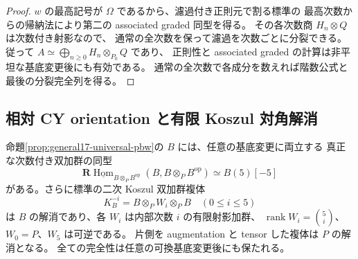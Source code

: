 \begin{proof}
$w$ の最高記号が $\Omega$ であるから、濾過付き正則元で割る標準の
最高次数からの帰納法により第二の associated graded 同型を得る。
その各次数商 $H_n\otimes Q$ は次数付き射影なので、
通常の全次数を保って濾過を次数ごとに分裂できる。
従って $A\simeq\bigoplus_{n\geq0}H_n\otimes_{P_0}Q$ であり、
正則性と associated graded の計算は非平坦な基底変更後にも有効である。
通常の全次数で各成分を数えれば階数公式と最後の分裂完全列を得る。
\end{proof}

\subsection{相対 CY orientation と有限 Koszul 対角解消}

\begin{proposition}[全係数に両立する五次元 CY 入力]
\label{prop:general17-relative-cy-koszul}
命題\ref{prop:general17-universal-pbw}の $B$ には、任意の基底変更に両立する
真正な次数付き双加群の同型
\begin{equation}\label{eq:general17-relative-cy-orientation}
 \mathbf R\underline{\operatorname{Hom}}_{B\otimes_PB^{\mathrm{op}}}
       (B,B\otimes_PB^{\mathrm{op}})\simeq B(5)[-5]
\end{equation}
がある。さらに標準の二次 Koszul 双加群複体
\[
 K_B^{-i}=B\otimes_P W_i\otimes_P B\quad(0\leq i\leq5)
\]
は $B$ の解消であり、各 $W_i$ は内部次数 $i$ の有限射影加群、
$\operatorname{rank} W_i=\binom5i$、$W_0=P$、$W_5$ は可逆である。
片側を augmentation と tensor した複体は $P$ の解消となる。
全ての完全性は任意の可換基底変更後にも保たれる。
\end{proposition}

